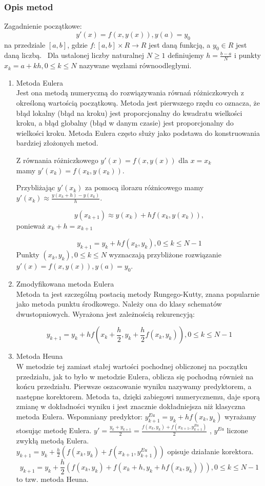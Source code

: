 \documentclass[12pt]{article}
\begin{document}
\subsubsection{Opis metod}
Zagadnienie początkowe:
$$y'(x)=f(x,y(x)),y(a)=y_0$$
na przedziale $[a,b]$, gdzie $f: [a,b] \times R \rightarrow R$ jest daną funkcją, a $y_0 \in R$ jest daną liczbą.
\ Dla ustalonej liczby naturalnej $N \geq 1$ definiujemy $h= \frac{b-a}{N}$ i punkty $x_k=a+kh, 0 \leq k \leq N$ nazywane węzłami równoodległymi.
\begin{enumerate}
\item
Metoda Eulera
\\Jest ona metodą numeryczną do rozwiązywania równań różniczkowych z określoną wartością początkową. Metoda jest pierwszego rzędu co oznacza, że błąd lokalny (błąd na kroku) jest proporcjonalny do kwadratu wielkości kroku, a błąd globalny (błąd w danym czasie) jest proporcjonalny do wielkości kroku.
 Metoda Eulera często służy jako podstawa do konstruowania bardziej złożonych metod.

Z równania różniczkowego $y'(x)=f(x,y(x))$ dla $x=x_k$
\\mamy
$y'(x_k)=f(x_k,y(x_k)).$

Przybliżając $y'(x_k)$ za pomocą ilorazu różnicowego mamy
\\ $y'(x_k)\approx\frac{y(x_k+h)-y(x_k)}{h}.$

$$y(x_{k+1}) \approx y(x_k) +hf(x_k,y(x_k)),$$  ponieważ $x_k+h=x_{k+1}$

$$y_{k+1}=y_k +hf(x_k,y_k), 0 \leq k \leq N-1$$
Punkty $(x_k,y_k), 0 \leq k \leq N$ wyznaczają przybliżone rozwiązanie
\\ $y'(x)=f(x,y(x)),y(a)=y_0$.
\item

Zmodyfikowana metoda Eulera
\\
Metoda ta jest szczególną postacią metody Rungego-Kutty, znana popularnie jako metoda punktu środkowego.
Należy ona do klasy schematów dwustopniowych.
Wyrażona jest zależnością rekurencyją:

$$y_{k+1}=y_k +hf(x_k + \frac{h}{2},y_k + \frac{h}{2}f(x_k,y_k)), 0 \leq k \leq N-1$$
\item Metoda Heuna
\\W metodzie tej zamiast stałej wartości pochodnej obliczonej na początku przedziału, jak to było w metodzie   Eulera,   oblicza   się   pochodną   również   na   końcu   przedziału.   Pierwsze   oszacowanie   wyniku nazywamy predyktorem, a następne korektorem. Metoda ta, dzięki zabiegowi numerycznemu, daje sporą zmianę w dokładności wyniku i jest znacznie dokładniejsza niż klasyczna metoda Eulera.
Wspomniany predyktor:
$y^{Eu}_{k+1}=y_k +hf(x_k,y_k)$ wyrażamy stosując metodę Eulera.
$y'=\frac{y_k+y_{k+1}}{2}=\frac{f(x_k,y_k)+f(x_{k+1},y^{Eu}_{k+1})}{2}$ , $y^{Eu}$ liczone zwykłą metodą Eulera.\\
$y_{k+1}=y_k +\frac{h}{2}(f(x_k,y_k )+f(x_{k+1},y^{Eu}_{k+1}))$ opisuje działanie korektora.
$$y_{k+1}=y_k +\frac{h}{2}(f(x_k,y_k )+f(x_k+h,y_k+hf(x_k,y_k))), 0 \leq k \leq N-1$$  to tzw. metoda Heuna.


\end{enumerate}
\end{document}
